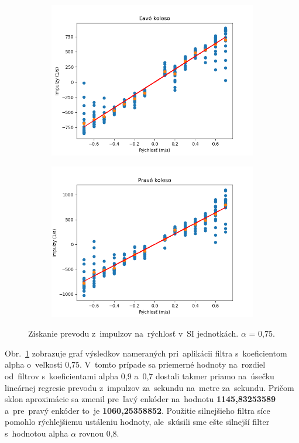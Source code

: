\begin{figure}[!htbp]
	\begin{subfigure}{0.5\textwidth}
		\includegraphics[width=\textwidth]{img/lw_075250.png}
	\end{subfigure}
	\hfill
	\begin{subfigure}{0.5\textwidth}
		\includegraphics[width=\textwidth]{img/rw_075250.png}
	\end{subfigure}
	\caption{Získanie prevodu z~impulzov na~rýchlosť v~SI jednotkách. \(\alpha\) = 0,75.}
	\label{fig:rw_lw_075250}
\end{figure}

Obr.~\ref{fig:rw_lw_075250} zobrazuje graf výsledkov nameraných pri~aplikácii filtra s~koeficientom alpha o~veľkosti 0,75.
V~tomto prípade sa priemerné hodnoty na~rozdiel od~filtrov s~koeficientami alpha 0,9 a~0,7 dostali takmer priamo na~úsečku
lineárnej regresie prevodu z~impulzov za~sekundu na~metre za~sekundu. Pričom sklon aproximácie sa zmenil pre~ľavý
enkóder na~hodnotu \textbf{1145,83253589} a~pre~pravý enkóder to~je \textbf{1060,25358852}. Použitie silnejšieho filtra
síce pomohlo rýchlejšiemu ustáleniu hodnoty, ale~skúsili sme ešte silnejší filter s~hodnotou alpha $\alpha$ rovnou 0,8.

